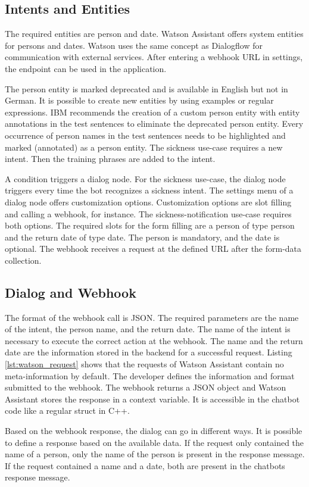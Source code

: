 \subsection{Intents and Entities}
The required entities are person and date.
Watson Assistant offers system entities for persons and dates.
Watson uses the same concept as Dialogflow for communication with external services.
After entering a webhook URL in settings, the endpoint can be used in the application.

The person entity is marked deprecated and is available in English but not in German.
It is possible to create new entities by using examples or regular expressions.
IBM recommends the creation of a custom person entity with entity annotations in the test sentences to eliminate the deprecated person entity.
Every occurrence of person names in the test sentences needs to be highlighted and marked (annotated) as a person entity.
The sickness use-case requires a new intent. 
Then the training phrases are added to the intent.

A condition triggers a dialog node.
For the sickness use-case, the dialog node triggers every time the bot recognizes a sickness intent.
The settings menu of a dialog node offers customization options.
Customization options are slot filling and calling a webhook, for instance.
The sickness-notification use-case requires both options.
The required slots for the form filling are a person of type person and the return date of type date.
The person is mandatory, and the date is optional.
The webhook receives a request at the defined URL after the form-data collection.

\subsection{Dialog and Webhook}
The format of the webhook call is JSON.
The required parameters are the name of the intent, the person name, and the return date.
The name of the intent is necessary to execute the correct action at the webhook.
The name and the return date are the information stored in the backend for a successful request.
Listing \ref{lst:watson_request} shows that the requests of Watson Assistant contain no meta-information by default.
The developer defines the information and format submitted to the webhook.
The webhook returns a JSON object and Watson Assistant stores the response in a context variable.
It is accessible in the chatbot code like a regular struct in C++.

Based on the webhook response, the dialog can go in different ways.
It is possible to define a response based on the available data.
If the request only contained the name of a person, only the name of the person is present in the response message.
If the request contained a name and a date, both are present in the chatbots response message.

